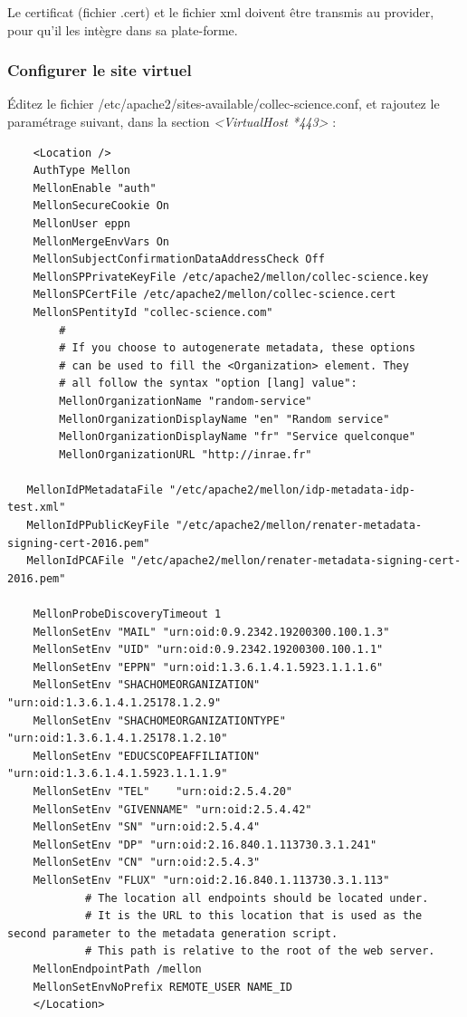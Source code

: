 Le certificat (fichier .cert) et le fichier xml doivent être transmis au provider, pour qu'il les intègre dans sa plate-forme.

\subsubsection{Configurer le site virtuel}

Éditez le fichier /etc/apache2/sites-available/collec-science.conf, et rajoutez le paramétrage suivant, dans la section \textit{<VirtualHost *443>} :
\begin{lstlisting}
    <Location />
    AuthType Mellon
    MellonEnable "auth"
    MellonSecureCookie On
    MellonUser eppn
    MellonMergeEnvVars On
    MellonSubjectConfirmationDataAddressCheck Off
    MellonSPPrivateKeyFile /etc/apache2/mellon/collec-science.key
    MellonSPCertFile /etc/apache2/mellon/collec-science.cert
    MellonSPentityId "collec-science.com"
        #
        # If you choose to autogenerate metadata, these options
        # can be used to fill the <Organization> element. They
        # all follow the syntax "option [lang] value":
        MellonOrganizationName "random-service"
        MellonOrganizationDisplayName "en" "Random service"
        MellonOrganizationDisplayName "fr" "Service quelconque"
        MellonOrganizationURL "http://inrae.fr"

   MellonIdPMetadataFile "/etc/apache2/mellon/idp-metadata-idp-test.xml"
   MellonIdPPublicKeyFile "/etc/apache2/mellon/renater-metadata-signing-cert-2016.pem"
   MellonIdPCAFile "/etc/apache2/mellon/renater-metadata-signing-cert-2016.pem"

    MellonProbeDiscoveryTimeout 1
    MellonSetEnv "MAIL" "urn:oid:0.9.2342.19200300.100.1.3"
    MellonSetEnv "UID" "urn:oid:0.9.2342.19200300.100.1.1"
    MellonSetEnv "EPPN" "urn:oid:1.3.6.1.4.1.5923.1.1.1.6"
    MellonSetEnv "SHACHOMEORGANIZATION" "urn:oid:1.3.6.1.4.1.25178.1.2.9"
    MellonSetEnv "SHACHOMEORGANIZATIONTYPE" "urn:oid:1.3.6.1.4.1.25178.1.2.10"
    MellonSetEnv "EDUCSCOPEAFFILIATION" "urn:oid:1.3.6.1.4.1.5923.1.1.1.9"
    MellonSetEnv "TEL"    "urn:oid:2.5.4.20"
    MellonSetEnv "GIVENNAME" "urn:oid:2.5.4.42"
    MellonSetEnv "SN" "urn:oid:2.5.4.4"
    MellonSetEnv "DP" "urn:oid:2.16.840.1.113730.3.1.241"
    MellonSetEnv "CN" "urn:oid:2.5.4.3"
    MellonSetEnv "FLUX" "urn:oid:2.16.840.1.113730.3.1.113"
            # The location all endpoints should be located under.
            # It is the URL to this location that is used as the second parameter to the metadata generation script.
            # This path is relative to the root of the web server.
    MellonEndpointPath /mellon
    MellonSetEnvNoPrefix REMOTE_USER NAME_ID
    </Location>
\end{lstlisting}

